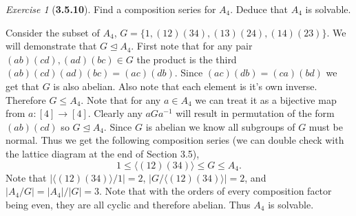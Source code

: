 \documentclass[12pt]{amsart}
\makeatletter
\theoremstyle{remark}
\newtheorem*{exercise}{Exercise}%
\renewenvironment{proof}[1][\proofname]{\par\doublespacing
  \pushQED{\qed}%
  \normalfont \topsep6\p@\@plus6\p@\relax
  \list{}{%
    \settowidth{\leftmargin}{\itshape\proofname:\hskip\labelsep}%
    \setlength{\labelwidth}{0pt}%
    \setlength{\itemindent}{-\leftmargin}%
  }%
  \item[\hskip\labelsep\itshape#1\@addpunct{:}]\ignorespaces
}{%
  \popQED\endlist\@endpefalse
  \singlespacing
}
\theoremstyle{mycomment}
\makeatother
\begin{document}
\begin{exercise}[\textbf{3.5.10}] Find a composition series for $A_4$. Deduce that $A_4$ is solvable. 
  \begin{proof}[Solution] Consider the subset of $A_4$, $G = \{1, (12)(34), (13)(24), (14)(23)\}$. We will demonstrate that $G \trianglelefteq A_4$. First note that for any pair $(a b)(c d), (a d)(b c) \in G$ the product is the third $(a b)(c d)(a d)(b c) = (ac)(db)$. Since $(ac)(db) = (ca)(bd)$ we get that $G$ is also abelian. Also note that each element is it's own inverse. Therefore $G \leq A_4$. Note that for any $a \in A_4$ we can treat it as a bijective map from $a:[4] \to [4]$. Clearly any $aGa^{-1}$ will result in permutation of the form $(a b)(c d)$ so $G\trianglelefteq A_4$.
    Since $G$ is abelian we know all subgroups of $G$ must be normal. Thus we get the following composition series (we can double check with the lattice diagram at the end of Section 3.5), 
    \begin{equation*}
      1 \leq \langle(12)(34)\rangle \leq G \leq A_4. 
    \end{equation*} 
    Note that $|\langle(12)(34)\rangle/1| = 2$, $|G/\langle(12)(34)\rangle| = 2$, and $|A_4/G| = |A_4|/|G| = 3$. Note that with the orders of every composition factor being even, they are all cyclic and therefore abelian. Thus $A_4$ is solvable. 
    \end{proof}
\end{exercise}
\vspace{.15in}
\end{document}
